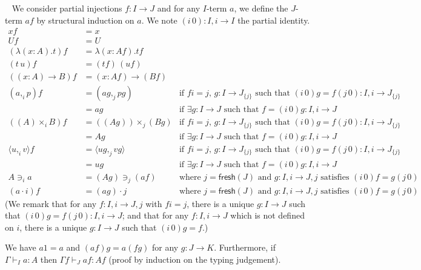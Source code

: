 \documentclass[english]{PaperTools/latex/lipics}
\newcommand\CP[3]{(#2,_{#1} #3)}
\newcommand\CTimes[2]{(#2) ×_{#1}}
\newcommand\op[1]{∋_{#1}}
\newcommand\fp[3]{⟨#2 ,_{#1} #3⟩}
\def\fresh#1{\mathsf{fresh}(#1)}
\begin{document}
\begin{definition}~
  \label{def:color-subst}
  We consider partial injections $f : I → J$ and for any $I$-term $a$,
  we define the $J$-term $af$ by structural induction on $a$.
  We note $(i\,0) : I,i → I$ the partial identity.
\begin{align*}
  x f & = x \\
  U f & = U \\
  (λ(x:A).t) f &= λ(x:Af).tf \\
  (t\,u) f &= (tf) \, (uf) \\
  ((x:A)→B) f &= (x:Af)→(Bf) \\
  \CP {i} a p f &= \CP {j} {ag} {pg}
    & \text{if $fi = j$, $g : I→J_{\{j\}}$ such that $(i\,0)g = f(j\,0) : I,i → J_{\{j\}}$} \\
                &= ag
    & \text{if $∃g : I→J$ such that $f = (i\,0)g : I,i → J$} \\
  (\CTimes {i} A B) f &= \CTimes {j} {(Ag)} {(Bg)}
    & \text{if $fi = j$, $g : I→J_{\{j\}}$ such that $(i\,0)g = f(j\,0) : I,i → J_{\{j\}}$} \\
                &= Ag
    & \text{if $∃g : I→J$ such that $f = (i\,0)g : I,i → J$} \\
  \fp {i} u v f &= \fp {j} {ug} {vg}
    & \text{if $fi = j$, $g : I→J_{\{j\}}$ such that $(i\,0)g = f(j\,0) : I,i → J_{\{j\}}$} \\
                &= ug
    & \text{if $∃g : I→J$ such that $f = (i\,0)g : I,i → J$} \\
  A \op {i} a &= (Ag) \op {j} (af)
    & \text{where $j = \fresh J$ and $g:I,i → J,j$ satisfies $(i\,0)f = g(j\,0)$} \\
  (a · i) f &= (ag) · j
    & \text{where $j = \fresh J$ and $g:I,i → J,j$ satisfies $(i\,0)f = g(j\,0)$}
\end{align*}
  (We remark that for any $f : I,i → J,j$ with $fi=j$, there is a
  unique $g : I → J$ such that $(i\,0)g = f(j\,0) : I,i → J$;
  and that for any $f : I,i → J$ which is not defined on $i$, there is
  a unique $g : I → J$ such that $(i\,0)g = f$.)

  We have $a1 = a$ and $(af)g = a(fg)$ for any $g : J → K$.
  Furthermore, if $Γ ⊢_I a : A$ then $Γ f ⊢_J af : Af$ (proof by
  induction on the typing judgement).
\end{definition}
\end{document}
